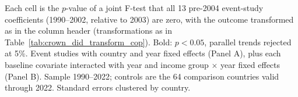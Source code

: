 \begin{table}[htbp]
\par\vspace{4pt}
\begin{minipage}{\textwidth}\footnotesize Each cell is the $p$-value of a joint F-test that all 13 pre-2004 event-study coefficients (1990--2002, relative to 2003) are zero, with the outcome transformed as in the column header (transformations as in Table~\ref{tab:crown_did_transform_cop}). Bold: $p < 0.05$, parallel trends rejected at 5\%. Event studies with country and year fixed effects (Panel A), plus each baseline covariate interacted with year and income group $\times$ year fixed effects (Panel B). Sample 1990--2022; controls are the 64 comparison countries valid through 2022. Standard errors clustered by country.\end{minipage}
\end{table}
